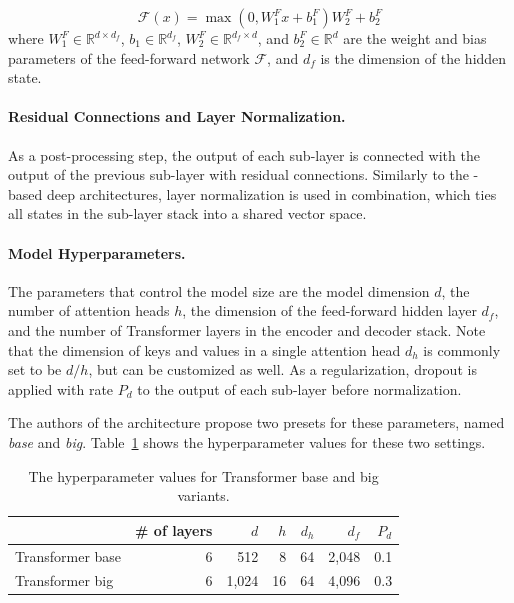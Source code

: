 \begin{equation}
  \mathcal{F}(x) = \max(0, W_1^Fx + b_1^F)W_2^F + b_2^F
\end{equation}
where $W_1^F \in \mathbb{R}^{d \times d_f}$, $b_1 \in \mathbb{R}^{d_f}$,
$W_2^F \in \mathbb{R}^{d_f \times d}$, and $b_2^F \in \mathbb{R}^d$ are the
weight and bias parameters of the feed-forward network $\mathcal{F}$, and $d_f$
is the dimension of the hidden state.

\paragraph{Residual Connections and Layer Normalization.} As a post-processing
step, the output of each sub-layer is connected with the output of the previous
sub-layer with residual connections.  Similarly to the
-based deep architectures, layer normalization is used in
combination, which ties all states in the sub-layer stack into a shared vector
space.

\paragraph{Model Hyperparameters.} The parameters that control the model size
are the model dimension $d$, the number of attention heads $h$, the dimension
of the feed-forward hidden layer $d_f$, and the number of Transformer layers in
the encoder and decoder stack. Note that the dimension of keys and values in a
single attention head $d_h$ is commonly set to be $d / h$, but can be
customized as well.  As a regularization, dropout \citep{srivastava2014dropout}
is applied with rate $P_d$ to the output of each sub-layer before
normalization.

The authors of the architecture propose two presets for these parameters, named
\emph{base} and \emph{big}. Table~\ref{tab:transformer-hyperparams} shows the
hyperparameter values for these two settings.

\begin{table}
  \centering
  \begin{tabular}{lrrrrrr}
    \toprule
      & \# of layers &  $d$  &  $h$  & $d_h$ & $d_f$ & $P_d$ \\
    \midrule
    Transformer base  & 6 &  512  & 8 & 64 &  2,048 & 0.1 \\
    Transformer big  & 6 &  1,024  & 16 & 64 &  4,096 & 0.3 \\
    \bottomrule
  \end{tabular}
  \caption{The hyperparameter values for Transformer base and big variants.}%
  \label{tab:transformer-hyperparams}
\end{table}


